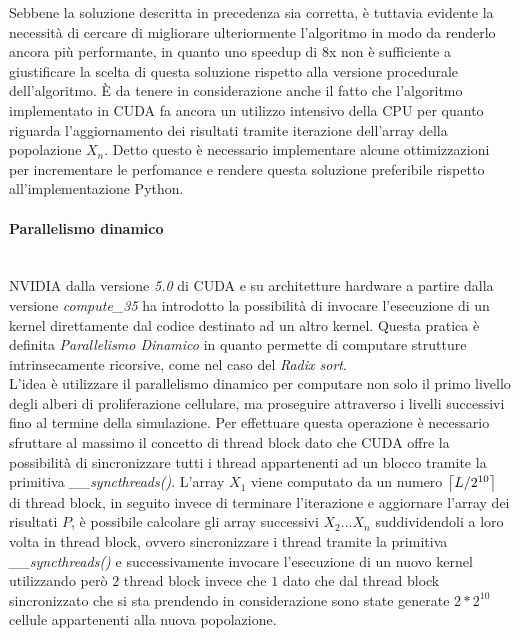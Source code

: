 Sebbene la soluzione descritta in precedenza sia corretta, è tuttavia
evidente la necessità di cercare di migliorare ulteriormente
l'algoritmo in modo da renderlo ancora più performante, in quanto uno
speedup di 8x non è sufficiente a giustificare la scelta di questa soluzione
rispetto alla versione procedurale dell'algoritmo.
È da tenere in considerazione anche il fatto che l'algoritmo implementato
in CUDA fa ancora un utilizzo intensivo della CPU per quanto riguarda
l'aggiornamento dei risultati tramite iterazione dell'array della
popolazione $X_{n}$.
Detto questo è necessario implementare alcune ottimizzazioni per
incrementare le perfomance e rendere questa soluzione preferibile rispetto
all'implementazione Python.

\paragraph{Parallelismo dinamico}\mbox{}
\\
NVIDIA dalla versione \textit{5.0} di CUDA e su architetture hardware a partire
dalla versione \textit{compute\_35} ha introdotto la possibilità di invocare
l'esecuzione di un kernel direttamente dal codice destinato ad un altro kernel.
Questa pratica è definita
\textit{Parallelismo Dinamico}\cite{jones2012introduction} in quanto permette
di computare strutture intrinsecamente ricorsive, come nel caso del
\textit{Radix sort}\cite{merrill2011high}.
\\
L'idea è utilizzare il parallelismo dinamico per computare non solo il primo
livello degli alberi di proliferazione cellulare, ma proseguire attraverso i
livelli successivi fino al termine della simulazione.
Per effettuare questa operazione è necessario sfruttare al massimo il concetto di
thread block dato che CUDA offre la possibilità di sincronizzare
tutti i thread appartenenti ad un blocco tramite la primitiva
\textit{\_\_syncthreads()}\cite{jones2012introduction}.
L'array $X_{1}$ viene computato da un numero $\ceil*{L/2^{10}}$ di thread block,
in seguito invece di terminare l'iterazione e aggiornare l'array dei risultati
$P$, è possibile calcolare gli array successivi $X_{2}...X_{n}$ suddividendoli
a loro volta in thread block, ovvero sincronizzare i thread tramite la
primitiva \textit{\_\_syncthreads()} e successivamente invocare l'esecuzione di
un nuovo kernel utilizzando però $2$ thread block invece che $1$ dato che dal
thread block sincronizzato che si sta prendendo in considerazione sono state
generate $2 * 2^{10}$ cellule appartenenti alla nuova popolazione.

